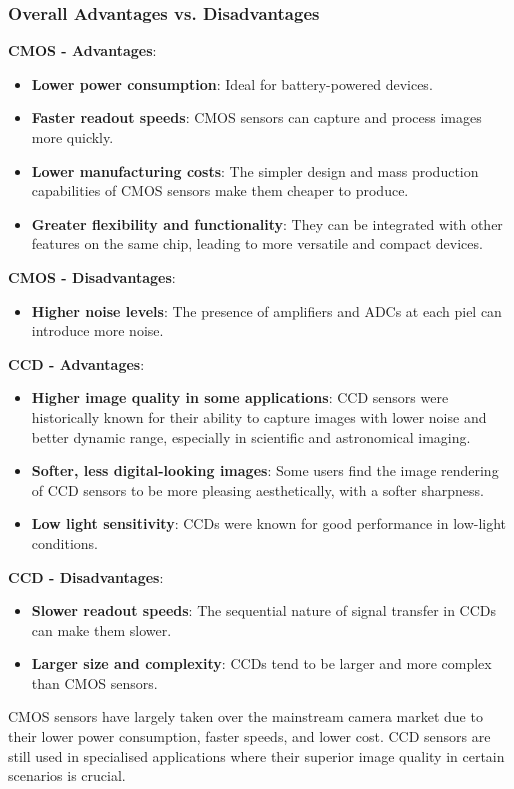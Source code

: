 \documentclass[10pt]{article}
\begin{document}
\begin{multicols}{2}
\subsubsection{Overall Advantages vs. Disadvantages}
\textbf{CMOS - Advantages}:
\begin{itemize}
    \item \textbf{Lower power consumption}: Ideal for battery-powered devices.
    \item \textbf{Faster readout speeds}: CMOS sensors can capture and process images more quickly.
    \item \textbf{Lower manufacturing costs}: The simpler design and mass production capabilities of CMOS sensors make them cheaper to produce.
    \item \textbf{Greater flexibility and functionality}: They can be integrated with other features on the same chip, leading to more versatile and compact devices.
\end{itemize}
\textbf{CMOS - Disadvantages}:
\begin{itemize}
    \item \textbf{Higher noise levels}: The presence of amplifiers and ADCs at each piel can introduce more noise.
\end{itemize}

\textbf{CCD - Advantages}:
\begin{itemize}
    \item \textbf{Higher image quality in some applications}: CCD sensors were historically known for their ability to capture images with lower noise and better dynamic range, especially in scientific and astronomical imaging.
    \item \textbf{Softer, less digital-looking images}: Some users find the image rendering of CCD sensors to be more pleasing aesthetically, with a softer sharpness.
    \item \textbf{Low light sensitivity}: CCDs were known for good performance in low-light conditions.
\end{itemize}
\textbf{CCD - Disadvantages}:
\begin{itemize}
    \item \textbf{Slower readout speeds}: The sequential nature of signal transfer in CCDs can make them slower.
    \item \textbf{Larger size and complexity}: CCDs tend to be larger and more complex than CMOS sensors.
\end{itemize}
CMOS sensors have largely taken over the mainstream camera market due to their lower power consumption, faster speeds, and lower cost. CCD sensors are still used in specialised applications where their superior image quality in certain scenarios is crucial. 


\end{multicols}
\end{document}
